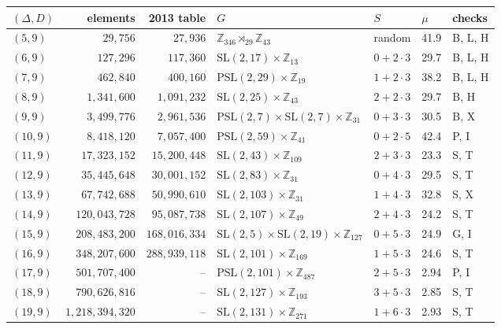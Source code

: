 \documentclass[11pt]{amsart}
\theoremstyle{definition}
\theoremstyle{remark}
\begin{document}
\begin{table}[ht]
\centering\scriptsize
\setlength{\tabcolsep}{3.5pt}
\begin{tabular}{@{}lrr>{\raggedright}p{}llp{}@{}}
\toprule
$(\Delta,D)$ & elements & 2013 table & $G$ & $S$ & $\mu$ & checks\\
\midrule
$(5,9)$ & $29{,}756$ & $27{,}936$ & $\mathbb{Z}_{346}\rtimes_{29}\mathbb{Z}_{43}$ & random & 41.9 & B, L, H\\
$(6,9)$ & $127{,}296$ & $117{,}360$ & $\mathrm{SL}(2,17)\times\mathbb{Z}_{13}$ & $0+2\cdot3$ & 29.7 & B, L, H\\
$(7,9)$ & $462{,}840$ & $400{,}160$ & $\mathrm{PSL}(2,29)\times\mathbb{Z}_{19}$ & $1+2\cdot3$ & 38.2 & B, L, H\\
$(8,9)$ & $1{,}341{,}600$ & $1{,}091{,}232$ & $\mathrm{SL}(2,25)\times\mathbb{Z}_{43}$ & $2+2\cdot3$ & 29.7 & B, H\\
$(9,9)$ & $3{,}499{,}776$ & $2{,}961{,}536$ & $\mathrm{PSL}(2,7)\times\mathrm{SL}(2,7)\times\mathbb{Z}_{31}$ & $0+3\cdot3$ & 30.5 & B, X\\
$(10,9)$ & $8{,}418{,}120$ & $7{,}057{,}400$ & $\mathrm{PSL}(2,59)\times\mathbb{Z}_{41}$ & $0+2\cdot5$ & 42.4 & P, I\\
$(11,9)$ & $17{,}323{,}152$ & $15{,}200{,}448$ & $\mathrm{SL}(2,43)\times\mathbb{Z}_{109}$ & $2+3\cdot3$ & 23.3 & S, T\\
$(12,9)$ & $35{,}445{,}648$ & $30{,}001{,}152$ & $\mathrm{SL}(2,83)\times\mathbb{Z}_{31}$ & $0+4\cdot3$ & 29.5 & S, T\\
$(13,9)$ & $67{,}742{,}688$ & $50{,}990{,}610$ & $\mathrm{SL}(2,103)\times\mathbb{Z}_{31}$ & $1+4\cdot3$ & 32.8 & S, X\\
$(14,9)$ & $120{,}043{,}728$ & $95{,}087{,}738$ & $\mathrm{SL}(2,107)\times\mathbb{Z}_{49}$ & $2+4\cdot3$ & 24.2 & S, T\\
$(15,9)$ & $208{,}483{,}200$ & $168{,}016{,}334$ & $\mathrm{SL}(2,5)\times\mathrm{SL}(2,19)\times\mathbb{Z}_{127}$ & $0+5\cdot3$ & 24.9 & G, I\\
$(16,9)$ & $348{,}207{,}600$ & $288{,}939{,}118$ & $\mathrm{SL}(2,101)\times\mathbb{Z}_{169}$ & $1+5\cdot3$ & 24.6 & S, T\\
$(17,9)$ & $501{,}707{,}400$ & -- & $\mathrm{PSL}(2,101)\times\mathbb{Z}_{487}$ & $2+5\cdot3$ & 2.94 & P, I\\
$(18,9)$ & $790{,}626{,}816$ & -- & $\mathrm{SL}(2,127)\times\mathbb{Z}_{193}$ & $3+5\cdot3$ & 2.85 & S, T\\
$(19,9)$ & $1{,}218{,}394{,}320$ & -- & $\mathrm{SL}(2,131)\times\mathbb{Z}_{271}$ & $1+6\cdot3$ & 2.93 & S, T\\

\end{tabular}
\end{table}
\end{document}
